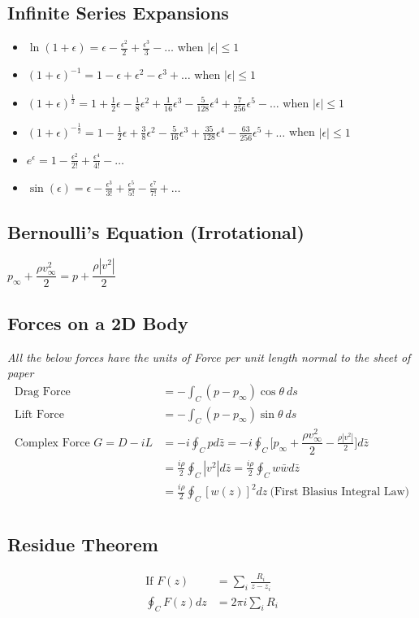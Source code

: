 \documentclass[10pt, letterpaper, notitlepage, landscape]{article}
\begin{document}
\subsection{Infinite Series Expansions}
\begin{itemize}
  \item $\ln(1+\epsilon) = \epsilon - \frac{\epsilon^2}{2} + \frac{\epsilon^3}{3} - \dots$ when $|\epsilon| \le 1$
  \item $(1+\epsilon)^{-1} = 1 - \epsilon + \epsilon^2 - \epsilon^3 + \dots$ when $|\epsilon| \le 1$
  \item $(1+\epsilon)^{\frac{1}{2}} = 1 + \frac{1}{2} \epsilon - \frac{1}{8} \epsilon^2 + \frac{1}{16} \epsilon^3 - \frac{5}{128} \epsilon^4 + \frac{7}{256} \epsilon^5 - \dots$ when $|\epsilon| \le 1$
  \item $(1+\epsilon)^{-\frac{1}{2}} = 1 - \frac{1}{2} \epsilon + \frac{3}{8} \epsilon^2 - \frac{5}{16} \epsilon^3 + \frac{35}{128} \epsilon^4 - \frac{63}{256} \epsilon^5 + \dots$ when $|\epsilon| \le 1$
  \item $e^{\epsilon} = 1 - \frac{\epsilon^2}{2!} + \frac{\epsilon^4}{4!} - \dots$
  \item $\sin(\epsilon) = \epsilon - \frac{\epsilon^3}{3!} + \frac{\epsilon^5}{5!} - \frac{\epsilon^7}{7!} + \dots$ 
\end{itemize}

\subsection{Bernoulli's Equation (Irrotational)}
$p_{\infty} + \dfrac{\rho v^2_{\infty}}{2} = p + \dfrac{\rho |v^2|}{2} $

\subsection{Forces on a 2D Body}
\textit{All the below forces have the units of Force per unit length normal to the sheet of paper}
\begin{align*}
\text{Drag Force} &= -\int_{C}^{} (p-p_{\infty}) \cos{\theta}\ ds \\
\text{Lift Force} &= -\int_{C}^{} (p-p_{\infty}) \sin{\theta}\ ds \\
\text{Complex Force } G = D - i L &= -i \oint_{C}^{} p d\bar{z} = -i \oint_{C}^{} \Biggl[ p_{\infty} + \dfrac{\rho v^2_{\infty}}{2} -  \frac{\rho |v^2|}{2} \Biggr] d\bar{z} \\
&= \frac{i \rho}{2} \oint_{C}^{} |v^2| d\bar{z} = \frac{i \rho}{2} \oint_{C}^{} w \bar{w} d\bar{z} \\
&= \frac{i \rho}{2} \oint_{C}^{} [w(z)]^2 dz \ \bigl(\text{First Blasius Integral Law}\bigr) \\
\end{align*}

\subsection{Residue Theorem}
\begin{align*}
\text{If } F(z) &= \sum_{i}^{} \frac{R_i}{z - z_i} \\
\oint_{C}^{} F(z) dz &= 2 \pi i \sum_{i}^{} R_i \\
\end{align*}
\end{document}
